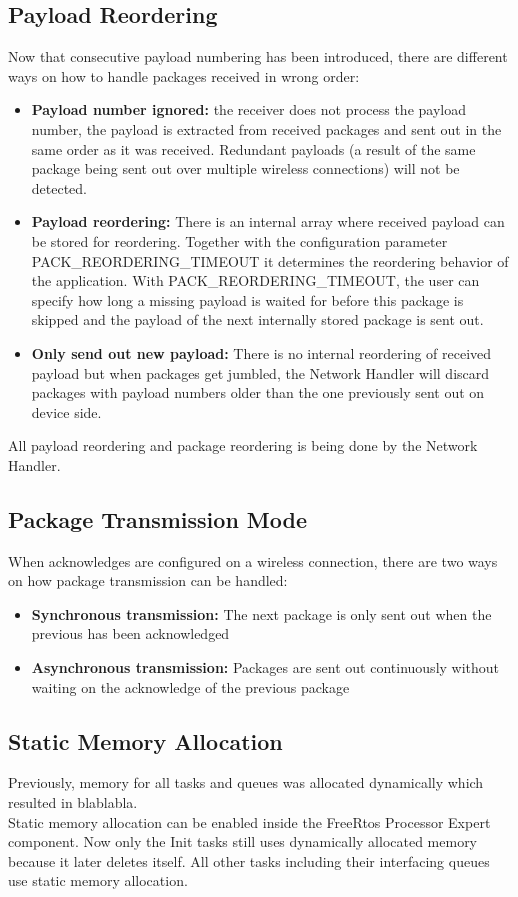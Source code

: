 \subsection{Payload Reordering}
Now that consecutive payload numbering has been introduced, there are different ways on how to handle packages received in wrong order:
\begin{itemize}
    \item \textbf{Payload number ignored:} the receiver does not process the payload number, the payload is extracted from received packages and sent out in the same order as it was received. Redundant payloads (a result of the same package being sent out over multiple wireless connections) will not be detected.
    \item \textbf{Payload reordering:} There is an internal array where received payload can be stored for reordering. Together with the configuration parameter PACK\_REORDERING\_TIMEOUT it determines the reordering behavior of the application. With PACK\_REORDERING\_TIMEOUT, the user can specify how long a missing payload is waited for before this package is skipped and the payload of the next internally stored package is sent out.
    \item \textbf{Only send out new payload:} There is no internal reordering of received payload but when packages get jumbled, the Network Handler will discard packages with payload numbers older than the one previously sent out on device side.
\end{itemize}
All payload reordering and package reordering is being done by the Network Handler. 
%
%
\subsection{Package Transmission Mode}
When acknowledges are configured on a wireless connection, there are two ways on how package transmission can be handled:
\begin{itemize}
    \item \textbf{Synchronous transmission:} The next package is only sent out when the previous has been acknowledged
    \item \textbf{Asynchronous transmission:} Packages are sent out continuously without waiting on the acknowledge of the previous package
\end{itemize}
%
%
\subsection{Static Memory Allocation}
Previously, memory for all tasks and queues was allocated dynamically which resulted in blablabla.\\
Static memory allocation can be enabled inside the FreeRtos Processor Expert component. Now only the Init tasks still uses dynamically allocated memory because it later deletes itself. All other tasks including their interfacing queues use static memory allocation.
